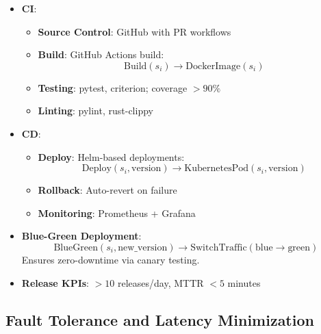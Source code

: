 \documentclass[11pt]{article}
\begin{document}
\begin{itemize}
    \item \textbf{CI}:
        \begin{itemize}
            \item \textbf{Source Control}: GitHub with PR workflows
            \item \textbf{Build}: GitHub Actions build:
                \[
                \text{Build}(s_i) \rightarrow \text{DockerImage}(s_i)
                \]
            \item \textbf{Testing}: pytest, criterion; coverage $ >90\% $
            \item \textbf{Linting}: pylint, rust-clippy
        \end{itemize}

    \item \textbf{CD}:
        \begin{itemize}
            \item \textbf{Deploy}: Helm-based deployments:
                \[
                \text{Deploy}(s_i, \text{version}) \rightarrow \text{KubernetesPod}(s_i, \text{version})
                \]
            \item \textbf{Rollback}: Auto-revert on failure
            \item \textbf{Monitoring}: Prometheus + Grafana
        \end{itemize}

    \item \textbf{Blue-Green Deployment}:
        \[
        \text{BlueGreen}(s_i, \text{new\_version}) \rightarrow \text{SwitchTraffic}(\text{blue} \rightarrow \text{green})
        \]
        Ensures zero-downtime via canary testing.

    \item \textbf{Release KPIs}: $ >10 $ releases/day, MTTR $ <5 $ minutes
\end{itemize}

\subsection{Fault Tolerance and Latency Minimization}
\label{subsec:fault_tolerance}
\end{document}
